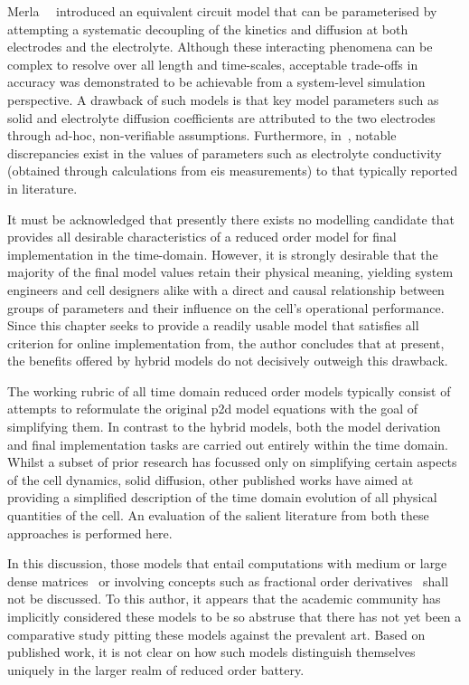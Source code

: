 Merla~\etal{}~\cite{Merla2018} introduced  an equivalent circuit model  that can
be  parameterised by  attempting a  systematic  decoupling of  the kinetics  and
diffusion at  both electrodes  and the  electrolyte. Although  these interacting
phenomena can be complex to resolve  over all length and time-scales, acceptable
trade-offs in  accuracy was  demonstrated to be  achievable from  a system-level
simulation perspective. A  drawback of such models is that  key model parameters
such  as  solid  and  electrolyte   diffusion  coefficients  are  attributed  to
the  two electrodes  through  ad-hoc,  non-verifiable assumptions.  Furthermore,
in~\cite{Merla2018},  notable discrepancies  exist in  the values  of parameters
such as  electrolyte conductivity (obtained through  calculations from \gls{eis}
measurements) to  that typically reported  in literature. 


It must be acknowledged that presently  there exists no modelling candidate that
provides  all desirable  characteristics  of  a reduced  order  model for  final
implementation in  the time-domain. However,  it is strongly desirable  that the
majority  of the  final model  values  retain their  physical meaning,  yielding
system engineers and cell designers alike  with a direct and causal relationship
between  groups of  parameters and  their  influence on  the cell's  operational
performance. Since  this chapter seeks  to provide  a readily usable  model that
satisfies  all  criterion  for online  implementation
from, the  author  concludes that  at  present, the  benefits
offered by hybrid models do not decisively outweigh this drawback.


The working rubric of all time  domain reduced order models typically consist of
attempts to reformulate the original \gls{p2d}  model equations with the goal of
simplifying them.  In contrast to the  hybrid models, both the  model derivation
and  final  implementation  tasks  are  carried out  entirely  within  the  time
domain.  Whilst a  subset of  prior research  has focussed  only on  simplifying
certain aspects  of the  cell dynamics, \eg{}  solid diffusion,  other published
works  have aimed  at  providing a  simplified description  of  the time  domain
evolution of all  physical quantities of the cell. An  evaluation of the salient
literature  from both  these  approaches is  performed here.


In this discussion,  those models that entail computations with  medium or large
dense  matrices~\cite{Li2016,Xu2016,Corno2015}  or  involving concepts  such  as
fractional order derivatives~\cite{Sabatier2015, Li2017, Mu2017, Wang2017} shall
not be  discussed. To this  author, it appears  that the academic  community has
implicitly considered these models to be so abstruse that there has not yet been
a comparative  study pitting these  models against  the prevalent art.  Based on
published  work, it  is  not clear  on how  such  models distinguish  themselves
uniquely in the larger realm of reduced order battery.


